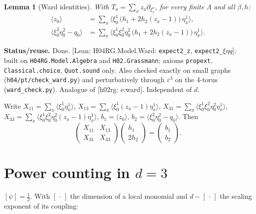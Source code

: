 \documentclass[11pt]{article}
\newtheorem{lemma}[theorem]{Lemma}
\theoremstyle{definition}
\theoremstyle{remark}
\newcommand{\avg}[1]{\langle #1\rangle}
\newcommand{\eps}{\varepsilon}
\newcommand{\status}[1]{\par\smallskip\noindent\textbf{Status/reuse.} #1\par\smallskip}
\newcommand{\reuse}[1]{\textsf{[h02rg: #1]}}
\newcommand{\lean}[1]{\textsf{[Lean: #1]}}
\begin{document}
\begin{lemma}[Ward identities]\label{lem:ward}
  With $T_a=\sum_xz_x\partial_{\xi^a_x}$, for every finite $\Lambda$ and all $\beta,h$:
  \begin{align}
    \avg{z_0}&=\sum_x\avg{\xi^1_0\,\big(h_1+2h_2(z_x-1)\big)\,\eta^1_x}, \tag{W1}\label{W1}\\
    \avg{\xi^2_0\eta^2_0-q_0}&=\sum_x\avg{\xi^1_0\xi^2_0\eta^2_0\,\big(h_1+2h_2(z_x-1)\big)\,\eta^1_x}.\tag{W2}\label{W2}
  \end{align}
\end{lemma}
\status{Done. \lean{H04RG.Model.Ward: \texttt{expect2\_z}, \texttt{expect2\_}$\xi\eta q$}; built on
\texttt{H04RG.Model.Algebra} and \texttt{H02.Grassmann}; axioms
\texttt{propext}, \texttt{Classical.choice}, \texttt{Quot.sound} only. Also checked exactly on
small graphs (\texttt{h04/pt/check\_ward.py}) and perturbatively through $\eps^3$ on the
4-torus (\texttt{ward\_check.py}). Analogue of \reuse{e:ward}. Independent of $d$.}

Write $X_{11}=\sum_x\avg{\xi^1_0\eta^1_x}$, $X_{13}=\sum_x\avg{\xi^1_0(z_x-1)\eta^1_x}$,
$X_{31}=\sum_x\avg{\xi^1_0\xi^2_0\eta^2_0\eta^1_x}$,
$X_{33}=\sum_x\avg{\xi^1_0\xi^2_0\eta^2_0(z_x-1)\eta^1_x}$,
$b_1=\avg{z_0}$, $b_2=\avg{\xi^2_0\eta^2_0-q_0}$. Then
\begin{equation}\label{e:wardsys}
  \begin{pmatrix}X_{11}&X_{13}\\X_{31}&X_{33}\end{pmatrix}
  \begin{pmatrix}h_1\\2h_2\end{pmatrix}=\begin{pmatrix}b_1\\b_2\end{pmatrix}.
\end{equation}

\section{Power counting in $d=3$}

$[\psi]=\tfrac12$. With $[\,\cdot\,]$ the dimension of a local monomial and $d-[\,\cdot\,]$
the scaling exponent of its coupling:
\end{document}
